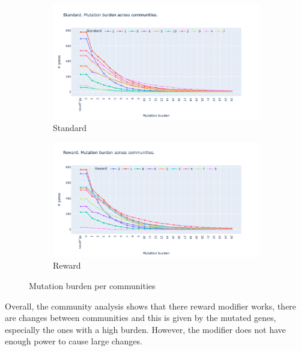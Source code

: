 \begin{figure}[!htb]
    \hfill
    \begin{subfigure}[b]{0.49\textwidth}
        \centering
        \includegraphics[width=\textwidth,keepaspectratio]{Sections/Network_I/Resources/P0/Comms/Mut_evo_Std_4k.png}
        \caption{Standard}
    \end{subfigure}
    \begin{subfigure}[b]{0.49\textwidth}
        \centering
        \includegraphics[width=\textwidth,keepaspectratio]{Sections/Network_I/Resources/P0/Comms/Mut_evo_Rwd_4k.png}
        \caption{Reward}
    \end{subfigure}
    \caption{Mutation burden per communities}
    \label{fig:N_I:p0_mut_burden}
\end{figure}


Overall, the community analysis shows that there reward modifier works, there are changes between communities and this is given by the mutated genes, especially the ones with a high burden. However, the modifier does not have enough power to cause large changes.

